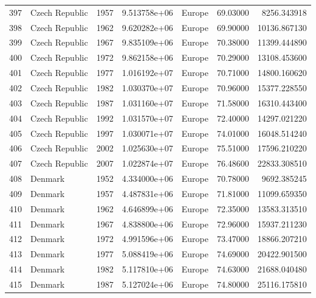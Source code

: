 \documentclass[
  letterpaper,
  DIV=11,
  numbers=noendperiod]{scrreprt}
\begin{document}
\begin{tabular}{llrrlrr}
397  &            Czech Republic &  1957 &  9.513758e+06 &    Europe &  69.03000 &    8256.343918 \\
398  &            Czech Republic &  1962 &  9.620282e+06 &    Europe &  69.90000 &   10136.867130 \\
399  &            Czech Republic &  1967 &  9.835109e+06 &    Europe &  70.38000 &   11399.444890 \\
400  &            Czech Republic &  1972 &  9.862158e+06 &    Europe &  70.29000 &   13108.453600 \\
401  &            Czech Republic &  1977 &  1.016192e+07 &    Europe &  70.71000 &   14800.160620 \\
402  &            Czech Republic &  1982 &  1.030370e+07 &    Europe &  70.96000 &   15377.228550 \\
403  &            Czech Republic &  1987 &  1.031160e+07 &    Europe &  71.58000 &   16310.443400 \\
404  &            Czech Republic &  1992 &  1.031570e+07 &    Europe &  72.40000 &   14297.021220 \\
405  &            Czech Republic &  1997 &  1.030071e+07 &    Europe &  74.01000 &   16048.514240 \\
406  &            Czech Republic &  2002 &  1.025630e+07 &    Europe &  75.51000 &   17596.210220 \\
407  &            Czech Republic &  2007 &  1.022874e+07 &    Europe &  76.48600 &   22833.308510 \\
408  &                   Denmark &  1952 &  4.334000e+06 &    Europe &  70.78000 &    9692.385245 \\
409  &                   Denmark &  1957 &  4.487831e+06 &    Europe &  71.81000 &   11099.659350 \\
410  &                   Denmark &  1962 &  4.646899e+06 &    Europe &  72.35000 &   13583.313510 \\
411  &                   Denmark &  1967 &  4.838800e+06 &    Europe &  72.96000 &   15937.211230 \\
412  &                   Denmark &  1972 &  4.991596e+06 &    Europe &  73.47000 &   18866.207210 \\
413  &                   Denmark &  1977 &  5.088419e+06 &    Europe &  74.69000 &   20422.901500 \\
414  &                   Denmark &  1982 &  5.117810e+06 &    Europe &  74.63000 &   21688.040480 \\
415  &                   Denmark &  1987 &  5.127024e+06 &    Europe &  74.80000 &   25116.175810 \\

\end{tabular}
\end{document}
